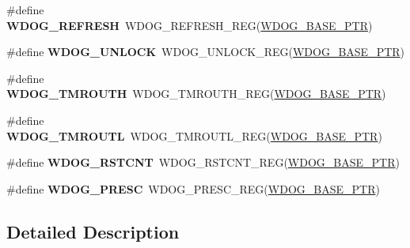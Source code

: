 \begin{DoxyCompactItemize}
\item 
\hypertarget{group___w_d_o_g___register___accessor___macros_ga0b4ee41e96710a1c020f3eb2af43f857}{}\#define {\bfseries W\+D\+O\+G\+\_\+\+R\+E\+F\+R\+E\+S\+H}~W\+D\+O\+G\+\_\+\+R\+E\+F\+R\+E\+S\+H\+\_\+\+R\+E\+G(\hyperlink{group___w_d_o_g___peripheral_ga72fb27c7bc1ae124f180d8f2c7b9fa79}{W\+D\+O\+G\+\_\+\+B\+A\+S\+E\+\_\+\+P\+T\+R})\label{group___w_d_o_g___register___accessor___macros_ga0b4ee41e96710a1c020f3eb2af43f857}

\item 
\hypertarget{group___w_d_o_g___register___accessor___macros_gaae3cce316f6ec53a8962eae6e10652d4}{}\#define {\bfseries W\+D\+O\+G\+\_\+\+U\+N\+L\+O\+C\+K}~W\+D\+O\+G\+\_\+\+U\+N\+L\+O\+C\+K\+\_\+\+R\+E\+G(\hyperlink{group___w_d_o_g___peripheral_ga72fb27c7bc1ae124f180d8f2c7b9fa79}{W\+D\+O\+G\+\_\+\+B\+A\+S\+E\+\_\+\+P\+T\+R})\label{group___w_d_o_g___register___accessor___macros_gaae3cce316f6ec53a8962eae6e10652d4}

\item 
\hypertarget{group___w_d_o_g___register___accessor___macros_gab4868d043e2cfec8f98cfb8782bd60e6}{}\#define {\bfseries W\+D\+O\+G\+\_\+\+T\+M\+R\+O\+U\+T\+H}~W\+D\+O\+G\+\_\+\+T\+M\+R\+O\+U\+T\+H\+\_\+\+R\+E\+G(\hyperlink{group___w_d_o_g___peripheral_ga72fb27c7bc1ae124f180d8f2c7b9fa79}{W\+D\+O\+G\+\_\+\+B\+A\+S\+E\+\_\+\+P\+T\+R})\label{group___w_d_o_g___register___accessor___macros_gab4868d043e2cfec8f98cfb8782bd60e6}

\item 
\hypertarget{group___w_d_o_g___register___accessor___macros_ga37ac1b7e81db9a5b20a502c970d712c2}{}\#define {\bfseries W\+D\+O\+G\+\_\+\+T\+M\+R\+O\+U\+T\+L}~W\+D\+O\+G\+\_\+\+T\+M\+R\+O\+U\+T\+L\+\_\+\+R\+E\+G(\hyperlink{group___w_d_o_g___peripheral_ga72fb27c7bc1ae124f180d8f2c7b9fa79}{W\+D\+O\+G\+\_\+\+B\+A\+S\+E\+\_\+\+P\+T\+R})\label{group___w_d_o_g___register___accessor___macros_ga37ac1b7e81db9a5b20a502c970d712c2}

\item 
\hypertarget{group___w_d_o_g___register___accessor___macros_gae3600ebbeca42091142fe17f7f2eab6a}{}\#define {\bfseries W\+D\+O\+G\+\_\+\+R\+S\+T\+C\+N\+T}~W\+D\+O\+G\+\_\+\+R\+S\+T\+C\+N\+T\+\_\+\+R\+E\+G(\hyperlink{group___w_d_o_g___peripheral_ga72fb27c7bc1ae124f180d8f2c7b9fa79}{W\+D\+O\+G\+\_\+\+B\+A\+S\+E\+\_\+\+P\+T\+R})\label{group___w_d_o_g___register___accessor___macros_gae3600ebbeca42091142fe17f7f2eab6a}

\item 
\hypertarget{group___w_d_o_g___register___accessor___macros_gac927e6dd73774cbbb57d36bbe3351925}{}\#define {\bfseries W\+D\+O\+G\+\_\+\+P\+R\+E\+S\+C}~W\+D\+O\+G\+\_\+\+P\+R\+E\+S\+C\+\_\+\+R\+E\+G(\hyperlink{group___w_d_o_g___peripheral_ga72fb27c7bc1ae124f180d8f2c7b9fa79}{W\+D\+O\+G\+\_\+\+B\+A\+S\+E\+\_\+\+P\+T\+R})\label{group___w_d_o_g___register___accessor___macros_gac927e6dd73774cbbb57d36bbe3351925}

\end{DoxyCompactItemize}


\subsection{Detailed Description}
